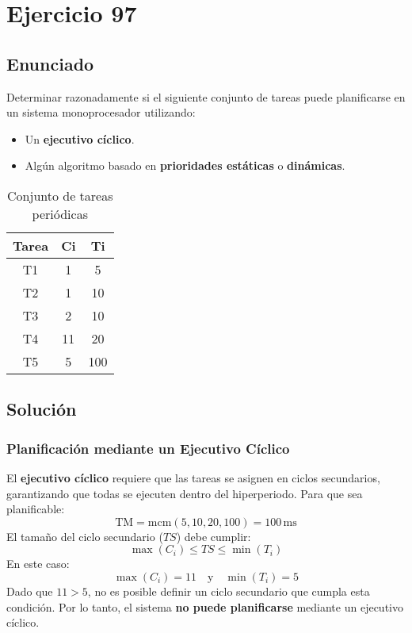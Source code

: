 \documentclass[a4paper,12pt]{article}
\begin{document}
\section{Ejercicio 97}
\subsection{Enunciado}
Determinar razonadamente si el siguiente conjunto de tareas puede planificarse en un sistema monoprocesador utilizando:
\begin{itemize}
    \item Un \textbf{ejecutivo cíclico}.
    \item Algún algoritmo basado en \textbf{prioridades estáticas} o \textbf{dinámicas}.
\end{itemize}

\begin{table}[H]
\centering
\begin{tabular}{|c|c|c|}
\hline
\textbf{Tarea} & \textbf{Ci} & \textbf{Ti} \\ \hline
T1 & 1 & 5 \\ \hline
T2 & 1 & 10 \\ \hline
T3 & 2 & 10 \\ \hline
T4 & 11 & 20 \\ \hline
T5 & 5 & 100 \\ \hline
\end{tabular}
\caption{Conjunto de tareas periódicas}
\end{table}

\subsection{Solución}
\subsubsection{Planificación mediante un Ejecutivo Cíclico}
El \textbf{ejecutivo cíclico} requiere que las tareas se asignen en ciclos secundarios, garantizando que todas se ejecuten dentro del hiperperiodo. Para que sea planificable:
\[
\text{TM} = \text{mcm}(5, 10, 20, 100) = 100 \, \text{ms}
\]
El tamaño del ciclo secundario (\(TS\)) debe cumplir:
\[
\max(C_i) \leq TS \leq \min(T_i)
\]
En este caso:
\[
\max(C_i) = 11 \quad \text{y} \quad \min(T_i) = 5
\]
Dado que \(11 > 5\), no es posible definir un ciclo secundario que cumpla esta condición. Por lo tanto, el sistema \textbf{no puede planificarse} mediante un ejecutivo cíclico.
\end{document}
